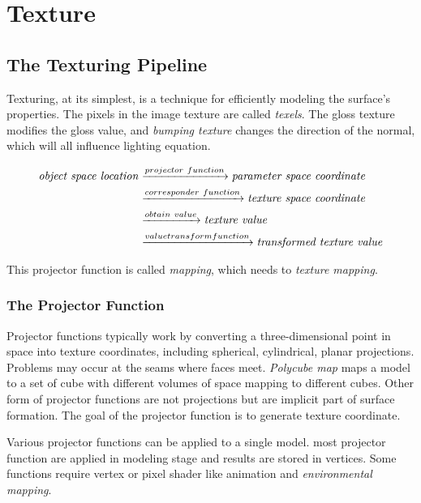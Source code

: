 \documentclass[10pt, a4paper]{article}
\begin{document}
    
    \section{Texture}
        \subsection{The Texturing Pipeline}
            Texturing, at its simplest, is a technique for efficiently modeling the surface's properties. The pixels in the image texture are called \emph{texels}. The gloss texture modifies the gloss value, and \emph{bumping texture} changes the direction of the normal, which will all influence lighting equation.
            
            \begin{align*}
                \text{\emph{{object space location}}} 
                &\xrightarrow{projector\ function} \emph{parameter space coordinate}\\
                &\xrightarrow{corresponder\ function} \emph{texture space coordinate} \\
                &\xrightarrow{obtain\ value} \emph{texture value}\\
                &\xrightarrow{value transform function} \emph{transformed  texture value}
            \end{align*}

            This projector function is called \emph{mapping}, which needs to \emph{texture mapping}.

            \subsubsection{The Projector Function}
                Projector functions typically work by converting a three-dimensional point in space into texture coordinates, including spherical, cylindrical, planar projections. Problems may occur at the seams where faces meet. \emph{Polycube map} maps a model to a set of cube with different volumes of space mapping to different cubes. Other form of projector functions are not projections but are implicit part of surface formation. The goal of the projector function is to generate texture coordinate. 

                Various projector functions can be applied to a single model. most projector function are applied in modeling stage and results are stored in vertices. Some functions require vertex or pixel shader like animation and \emph{environmental mapping}.
\end{document}
